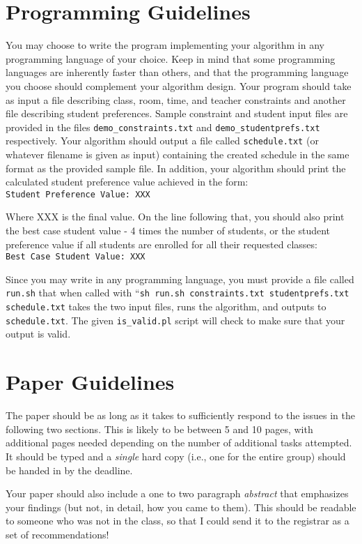 \documentclass[12pt]{article}
\begin{document}
\section{Programming Guidelines}
You may choose to write the program implementing your algorithm in any programming language of your choice. Keep in mind that some programming languages are inherently faster than others, and that the programming language you choose should complement your algorithm design. Your program should take as input a file describing class, room, time, and teacher constraints and another file describing student preferences. Sample constraint and student input files are provided in the files \texttt{demo\_constraints.txt} and \texttt{demo\_studentprefs.txt} respectively. Your algorithm should output a file called \texttt{schedule.txt} (or whatever filename is given as input) containing the created schedule in the same format as the provided sample file. In addition, your algorithm should print the calculated student preference value achieved in the form:\\
\texttt{Student Preference Value: XXX}

\noindent Where XXX is the final value. On the line following that, you should also print the best case student value - 4 times the number of students, or the student preference value if all students are enrolled for all their requested classes:\\
\texttt{Best Case Student Value: XXX}

Since you may write in any programming language, you must provide a file called \texttt{run.sh} that when called with ``\texttt{sh run.sh constraints.txt studentprefs.txt schedule.txt} takes the two input files, runs the algorithm, and outputs to \texttt{schedule.txt}. The given \texttt{is\_valid.pl} script will check to make sure that your output is valid.

\section{Paper Guidelines}
The paper should be as long as it takes to sufficiently respond to the issues in the following two sections. This is likely to be between 5 and 10 pages, with additional pages needed depending on the number of additional tasks attempted. It should be typed and a \emph{single} hard copy (i.e., one for the entire group) should be handed in by the deadline.

Your paper should also include a one to two paragraph \emph{abstract} that emphasizes your findings (but not, in detail, how you came to them).  This should be readable to someone who was not in the class, so that I could send it to the registrar as a set of recommendations!
\end{document}
